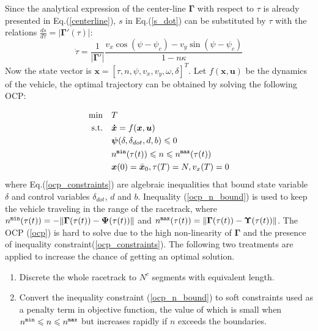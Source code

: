 \documentclass[conference, onecolumn]{IEEEtran}
\begin{document}
Since the analytical expression of the center-line $\mathbf{\Gamma}$ with respect to $\tau$ is already presented in Eq.(\ref{centerline}), $s$ in Eq.(\ref{s_dot}) can be substituted by $\tau$ with the relations $\frac{ds}{d\tau}=|\mathbf{\Gamma}'(\tau)|$:
\begin{equation}\label{tau_dot}
	\dot{\tau}  = \frac{1}{|\mathbf{\Gamma}'|}\frac{v_x \cos(\psi-\psi_c)-v_y \sin(\psi-\psi_c)}{1-n\kappa}
\end{equation}
Now the state vector is $\boldsymbol{x}=[\tau,n,\psi,v_x,v_y,\omega,\delta]^T$. Let $f(\boldsymbol{x},\boldsymbol{u})$ be the dynamics of the vehicle, the optimal trajectory can be obtained by solving the following OCP:

\begin{subequations}
	\begin{align}
		\min \quad & T\\
		\textrm{s.t.} \quad & \boldsymbol{\dot{x}}=f(\boldsymbol{x},\boldsymbol{u})\\
		\quad &  \boldsymbol{\psi}(\delta,\delta_{dot},d,b)\leqslant 0  \label{ocp_constraints}\\
		\quad &  n^{\tt min}(\tau(t))\leqslant  n\leqslant  n^{\tt max}(\tau(t)) \label{ocp_n_bound}\\
		\quad & \boldsymbol{x}(0)=\bar{\boldsymbol{x}}_0,{\tau(T)}=N,{v_x(T)}=0
		\label{ocp}
	\end{align}
\end{subequations}
where Eq.(\ref{ocp_constraints}) are algebraic inequalities that bound state variable $\delta$ and control variables $\delta_{dot}$, $d$ and $b$. Inequality (\ref{ocp_n_bound}) is used to keep the vehicle traveling in the range of the racetrack, where $n^{\tt min}(\tau(t)) = -\|\mathbf{\Gamma}(\tau(t))-\mathbf{\Psi}(\tau(t))\|$ and $n^{\tt max}(\tau(t)) = \|\mathbf{\Gamma}(\tau(t))-\mathbf{\Upsilon}(\tau(t))\|$. 
The OCP (\ref{ocp}) is hard to solve due to the high non-linearity of $\mathbf{\Gamma}$ and the presence of inequality constraint(\ref{ocp_constraints}). The following two treatments are applied to increase the chance of getting an optimal solution.
\begin{enumerate}
	\item Discrete the whole racetrack to $N^c$ segments with equivalent length.
	\item Convert the inequality constraint (\ref{ocp_n_bound}) to soft constraints used as a penalty term in objective function, the value of which is small when $n^{\tt min}\leqslant  n\leqslant  n^{\tt max} $ but increases rapidly if $n$ exceeds the boundaries. 	 
\end{enumerate}
\end{document}
